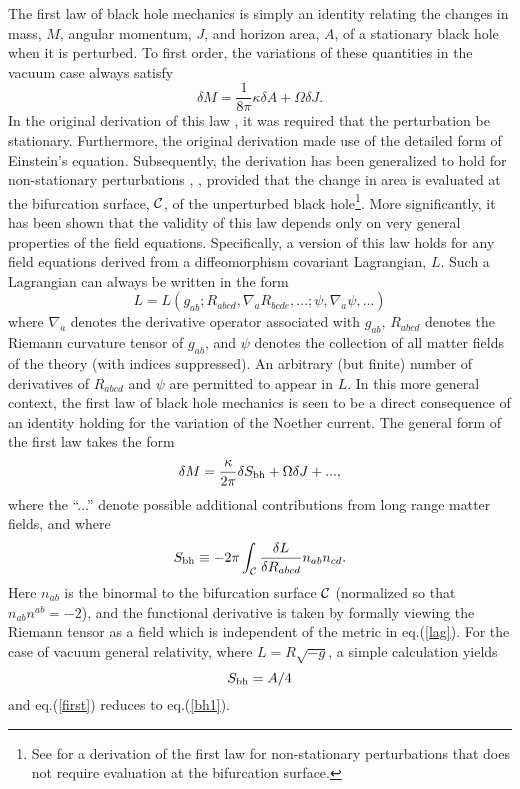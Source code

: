 \documentclass[12pt]{article}
\begin{document}
The first law of black hole mechanics is simply an identity relating
the changes in mass, $M$, angular momentum, $J$, and horizon area,
$A$, of a stationary black hole when it is perturbed. To
first order, the variations of these quantities in the vacuum case
always satisfy
\begin{equation}
\delta M = \frac{1}{8 \pi} \kappa \delta A + \Omega \delta J.
\label{bh1}
\end{equation}
In the original derivation of this law \cite{bch}, it was required
that the perturbation be stationary. Furthermore, the original
derivation made use of the detailed form of Einstein's
equation. Subsequently, the derivation has been generalized to hold
for non-stationary perturbations \cite{sw1}, \cite{iw}, provided that
the change in area is evaluated at the bifurcation surface, ${\cal
C}$, of the unperturbed black hole\footnote{See \cite{sor1} for a
derivation of the first law for non-stationary perturbations that does
not require evaluation at the bifurcation surface.}. More
significantly, it has been shown \cite{iw} that the validity of this
law depends only on very general properties of the field
equations. Specifically, a version of this law holds for any field
equations derived from a diffeomorphism covariant Lagrangian,
$L$. Such a Lagrangian can always be written in the form
\begin{equation}
L = L \left( g_{ab}; R_{abcd}, \nabla_a R_{bcde},
...;\psi, \nabla_a \psi, ...\right)
\label{lag}
\end{equation}
where $\nabla_a$ denotes the derivative operator associated with
$g_{ab}$, $R_{abcd}$ denotes the Riemann curvature tensor of $g_{ab}$,
and $\psi$ denotes the collection of all matter fields of the theory
(with indices suppressed). An arbitrary (but finite) number of
derivatives of $R_{abcd}$ and $\psi$ are permitted to appear in $L$.
In this more general context, the first law of black hole mechanics is
seen to be a direct consequence of an identity holding for the
variation of the Noether current. The general form of the first law
takes the form
\begin{equation}
\delta M = \frac{\kappa}{2 \pi} \delta S_{\rm bh} + \Omega \delta J + ...,
\label{first}
\end{equation}
where the ``...'' denote possible additional contributions from long
range matter fields, and where
\begin{equation}
S_{\rm bh} \equiv -2 \pi \int_{\cal C} \frac{\delta L}{\delta
R_{abcd}} n_{ab} n_{cd}
\label{Sbh} .
\end{equation}
Here $n_{ab}$ is the binormal to the bifurcation surface $\cal C$
(normalized so that $n_{ab} n^{ab} = -2$), and the functional
derivative is taken by formally viewing the Riemann tensor as a field
which is independent of the metric in eq.(\ref{lag}). For the case of
vacuum general relativity, where $L = R \sqrt{-g}$, a simple
calculation yields
\begin{equation}
S_{\rm bh} = A/4 
\label{Sbh2}
\end{equation}
and eq.(\ref{first}) reduces to eq.(\ref{bh1}).
\end{document}
